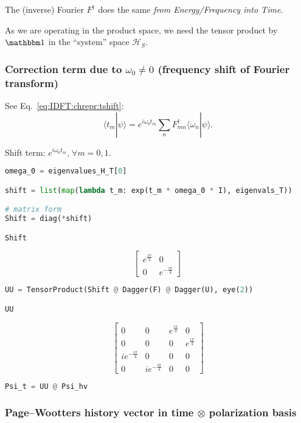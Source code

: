 The (inverse) Fourier $F^{\dagger}$ does the same \emph{from Energy/Frequency into Time}.

As we are operating in the product space, we need the tensor product by $\idop$ in the ``system'' space $\mathcal{H}_S$.

\subsubsection*{Correction term due to $\omega_0 \neq 0$ (frequency shift of Fourier transform)}

See Eq.~\eqref{eq:IDFT:chrepr:tshift}:
\begin{equation}
  \langle{t_{m}}|{\psi}\rangle = e^{i\omega_{0}t_m} \sum_n F^{\dagger}_{mn} \langle{\omega_n}|{\psi}\rangle \text{.}
\end{equation}

Shift term: $e^{i\omega_{0}t_m} \text{,} \; \forall m = 0, 1$.

\begin{lstlisting}[language=Python]
omega_0 = eigenvalues_H_T[0]

shift = list(map(lambda t_m: exp(t_m * omega_0 * I), eigenvals_T))

# matrix form
Shift = diag(*shift)

Shift
\end{lstlisting}
$$
  \left[\begin{matrix}e^{\frac{i \pi}{4}} & 0\\0 & e^{- \frac{i \pi}{4}}\end{matrix}\right]
$$

\begin{lstlisting}[language=Python]
UU = TensorProduct(Shift @ Dagger(F) @ Dagger(U), eye(2))

UU
\end{lstlisting}
$$
  \left[\begin{matrix}0 & 0 & e^{\frac{i \pi}{4}} & 0\\0 & 0 & 0 & e^{\frac{i \pi}{4}}\\i e^{- \frac{i \pi}{4}} & 0 & 0 & 0\\0 & i e^{- \frac{i \pi}{4}} & 0 & 0\end{matrix}\right]
$$

\begin{lstlisting}[language=Python]
Psi_t = UU @ Psi_hv
\end{lstlisting}

\subsubsection*{Page--Wootters history vector in time $\otimes$ polarization basis}

